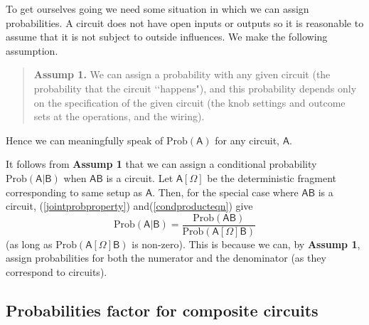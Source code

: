 \documentclass[10pt]{article}
\begin{document}
To get ourselves going we need some situation in which we can assign probabilities.  A circuit does not have open inputs or outputs so it is reasonable to assume that it is not subject to outside influences.  We make the following assumption.
\begin{quote}
{\bf Assump 1.}  We can assign a probability with any given circuit (the probability that the circuit \lq\lq happens"), and this probability depends only on the specification of the given circuit (the knob settings and outcome sets at the operations, and the wiring).
\end{quote}
Hence we can meaningfully speak of $\text{Prob}(\mathsf{A})$ for any circuit, $\mathsf{A}$.

It follows from {\bf Assump 1} that we can assign a conditional probability $\text{Prob}(\mathsf{A|B})$ when $\mathsf{AB}$ is a circuit.  Let $\mathsf{A}[\Omega]$ be the deterministic fragment corresponding to same setup as $\mathsf A$.  Then, for the special case where $\mathsf{AB}$ is a circuit, (\ref{jointprobproperty}) and(\ref{condproducteqn}) give
\begin{equation}\label{condforcircuit}
\text{Prob}(\mathsf{A|B})=\frac{\text{Prob}(\mathsf{AB})}{\text{Prob}(\mathsf{A}[\Omega]\mathsf{B})}
\end{equation}
(as long as $\text{Prob}(\mathsf{A}[\Omega]\mathsf{B})$ is non-zero).  This is because we can, by {\bf Assump 1}, assign probabilities for both the numerator and the denominator (as they correspond to circuits).

\subsection{Probabilities factor for composite circuits}\label{probsfactorsection}
\end{document}
